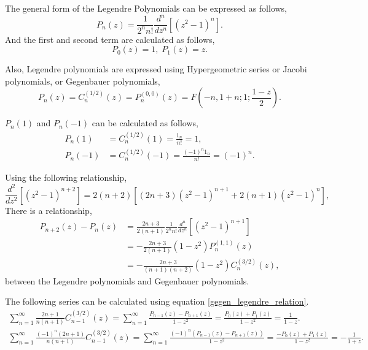 \documentclass{article}
\begin{document}
The general form of the Legendre Polynomials can be expressed as follows,
\begin{equation}
 P_n (z) = \frac{1}{2^n n!} \frac{d^n}{dz^n}\left[ (z^2 - 1)^n \right].
\end{equation}
And the first and second term are calculated as follows,
\begin{equation}
 P_0(z) = 1, \; P_1(z) = z.
\end{equation}

Also, Legendre polynomials are expressed using Hypergeometric series or Jacobi polynomials, or Gegenbauer polynomials,
\begin{equation}
 P_n(z) = C^{(1/2)}_n(z) = P^{(0, 0)}_n (z) = F\left(-n, 1+n; 1; \frac{1-z}{2}\right).
\end{equation}

$P_n(1)$ and $P_n(-1)$ can be calculated as follows,
\begin{align}
 P_n(1) &= C^{(1/2)}_n(1) = \frac{1_n}{n!} = 1,\label{legendre1}\\
 P_n(-1) &= C^{(1/2)}_n(-1) = \frac{(-1)^n 1_n}{n!} = (-1)^n.\label{legendre-1}
\end{align}


Using the following relationship,
\begin{equation}
 \frac{d^2}{dz^2}\left[ (z^2 - 1)^{n+2} \right] = 2(n+2)\left[ (2n+3) (z^2 - 1)^{n+1} + 2(n+1) (z^2 - 1)^n \right],
\end{equation}
There is a relationship,
\begin{align}
 P_{n+2}(z) - P_n(z) & = \frac{2n+3}{2(n+1)} \frac{1}{2^n n!} \frac{d^n}{dz^n}\left[ (z^2 - 1)^{n+1} \right]\nonumber\\
 & = -\frac{2n+3}{2(n+1)} (1-z^2) P^{(1,1)}_n(z)\nonumber\\
 & = -\frac{2n+3}{(n+1)(n+2)} (1-z^2) C^{(3/2)}_n(z),\label{gegen_legendre_relation}
\end{align}
between the Legendre polynomials and Gegenbauer polynomials.

The following series can be calculated using equation \eqref{gegen_legendre_relation}.
\begin{gather}
 \sum_{n=1}^{\infty}\frac{2n+1}{n(n+1)} C^{(3/2)}_{n-1} (z) = \sum_{n=1}^{\infty} \frac{P_{n-1}(z) - P_{n+1}(z)}{1-z^2} = \frac{P_{0}(z) + P_{1}(z)}{1-z^2} = \frac{1}{1-z}.\label{frac_1_1-z}\\
 \sum_{n=1}^{\infty}  \frac{(-1)^n(2n+1)}{n(n+1)} C^{(3/2)}_{n-1} (z) = \sum_{n=1}^{\infty} \frac{(-1)^n (P_{n-1}(z) - P_{n+1}(z))}{1-z^2} = \frac{-P_{0}(z) + P_{1}(z)}{1-z^2} = -\frac{1}{1+z}\label{-frac_1_1+z}.
\end{gather}
\end{document}

